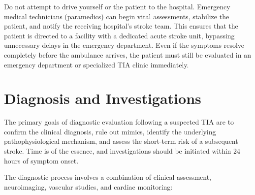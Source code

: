 Do not attempt to drive yourself or the patient to the hospital. Emergency medical technicians (paramedics) can begin vital assessments, stabilize the patient, and notify the receiving hospital's stroke team. This ensures that the patient is directed to a facility with a dedicated acute stroke unit, bypassing unnecessary delays in the emergency department. Even if the symptoms resolve completely before the ambulance arrives, the patient must still be evaluated in an emergency department or specialized TIA clinic immediately.

\section*{Diagnosis and Investigations}
The primary goals of diagnostic evaluation following a suspected TIA are to confirm the clinical diagnosis, rule out mimics, identify the underlying pathophysiological mechanism, and assess the short-term risk of a subsequent stroke. Time is of the essence, and investigations should be initiated within 24 hours of symptom onset.

The diagnostic process involves a combination of clinical assessment, neuroimaging, vascular studies, and cardiac monitoring:

